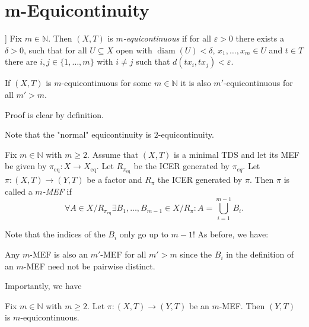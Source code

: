 \section{m-Equicontinuity}

\begin{frame}
    \begin{definition}[$m$-Equicontinuity [\cite{Garcia-Ramos2024}]]
	    Fix $m \in \mathbb{N}$. Then $(X, T)$ is \emph{$m$-equicontinuous} if for all $\varepsilon > 0$ there exists a $\delta > 0$, such that for all $U \subseteq X$ open with $\operatorname{diam}(U) < \delta$, $x_1, \dots, x_m \in U$ and $t \in T$ there are $i, j \in \{1, \dots, m\}$ with $i \neq j$ such that $d(tx_i, tx_j) < \varepsilon$.
    \end{definition}
    \pause
    \begin{proposition}
	    If $(X, T)$ is $m$-equicontinuous for some $m \in \mathbb{N}$ it is also $m'$-equicontinuous for all $m' > m$.
    \end{proposition}
    Proof is clear by definition.

    Note that the "normal" equicontinuity is $2$-equicontinuity.
\end{frame}

\begin{frame}
    \begin{definition}[$m$-MEF]
        Fix $m \in \mathbb{N}$ with $m \geq 2$. Assume that $(X, T)$ is a minimal TDS and let its MEF be given by $\pi_{\mathrm{eq}}: X \to X_{\mathrm{eq}}$. Let $R_{\pi_{\mathrm{eq}}}$ be the ICER generated by $\pi_{eq}$. Let $\pi: (X,T) \to (Y,T)$ be a factor and $R_\pi$ the ICER generated by $\pi$.
        Then $\pi$ is called a \emph{$m$-MEF} if
        \begin{equation*}
            \forall A \in X/R_{\pi_{\mathrm{eq}}} \exists B_1, \dots, B_{m-1} \in X/R_\pi: 
            A = \bigcup_{i=1}^{m-1} B_i.
        \end{equation*}
    \end{definition}
    Note that the indices of the $B_i$ only go up to $m-1$!
    \pause
    As before, we have:
    \begin{remark}
        Any $m$-MEF is also an $m'$-MEF for all $m' > m$
        since the $B_i$ in the definition of an $m$-MEF need not be pairwise distinct.
    \end{remark}
\end{frame}

\begin{frame}
    Importantly, we have
    \begin{proposition}
	    Fix $m \in \mathbb{N}$ with $m \geq 2$. Let $\pi : (X,T) \to (Y, T)$ be an $m$-MEF. Then $(Y, T)$ is $m$-equicontinuous.
    \end{proposition}
\end{frame}


